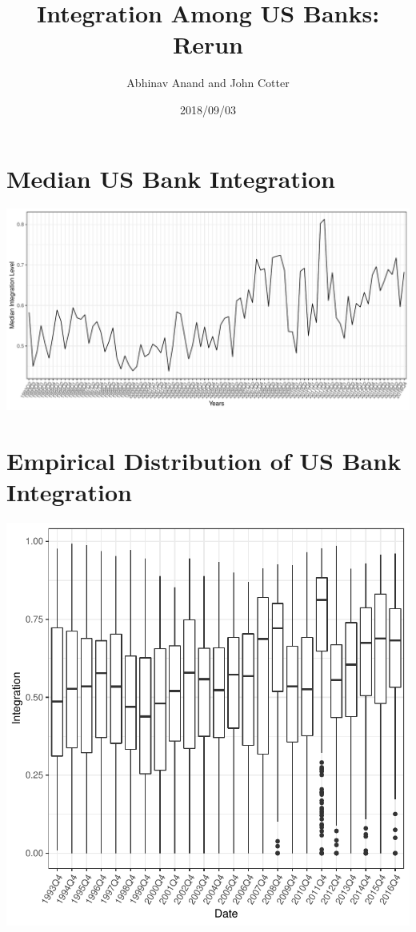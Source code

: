 \documentclass[11pt,]{article}
\title{Integration Among US Banks: Rerun}
\author{Abhinav Anand and John Cotter}
\date{2018/09/03}
\begin{document}
\maketitle

\section{Median US Bank Integration}\label{median-us-bank-integration}

\begin{center}\includegraphics{AC_US_Bank_Int_Results_1_files/figure-latex/med_US_bank_int-1} \end{center}

\section{Empirical Distribution of US Bank
Integration}\label{empirical-distribution-of-us-bank-integration}

\begin{center}\includegraphics{AC_US_Bank_Int_Results_1_files/figure-latex/emp_distr_US_bank_int-1} \end{center}
\end{document}
